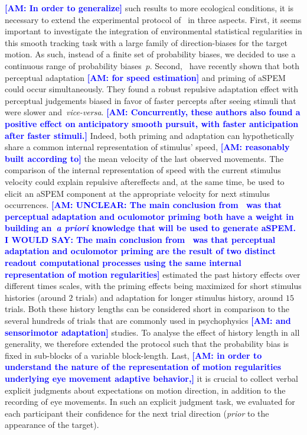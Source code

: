 \documentclass[12pt,english]{article}%
\newcommand{\citet}[1]{\textcite{#1}}
\newcommand{\seeFig}[1]{Figure~\ref{fig:#1}}
\newcommand{\seeSec}[1]{Section~\ref{sec:#1}}
\newcommand{\AM}[1]{\textbf{\textcolor{blue}{[AM: #1]}}}
\begin{document}
\AM{In order to generalize} such results to more ecological conditions,
it is necessary to extend the experimental protocol of~\citet{Montagnini2010} in three aspects.
First, it seems important to investigate the integration of environmental statistical regularities
in this smooth tracking task with
a large family of direction-biases for the target motion.
As such, instead of a finite set of probability biases, %
we decided to use a continuous range of probability biases~$p$. 
Second,~\citet{Maus2015} have recently shown that
both perceptual adaptation \AM{for speed estimation} and priming of aSPEM could occur simultaneously.
They found a robust repulsive adaptation effect
with perceptual judgements biased in favor of faster percepts
after seeing stimuli that were slower and~\textit{vice-versa}. \AM{Concurrently, these authors also found 
a positive effect on anticipatory smooth pursuit, with faster anticipation after faster stimuli.}
Indeed, both priming and adaptation can hypothetically share
a common internal representation of stimulus' speed,
\AM{reasonably built according to} the mean velocity of the last observed movements.
The comparison of the internal representation of speed
with the current stimulus velocity could explain repulsive aftereffects and,
at the same time, be used to elicit 
an aSPEM component at the appropriate velocity
for next stimulus occurrences.
\AM{UNCLEAR: The main conclusion from~\citet{Maus2015} was that
perceptual adaptation and oculomotor priming
both have a weight in building an~\textit{a priori} knowledge
that will be used to generate aSPEM. I WOULD SAY: The main conclusion from~\citet{Maus2015} was that
perceptual adaptation and oculomotor priming
are the result of two distinct readout computational processes using the same internal representation of motion regularities}
\citet{Maus2015} estimated the past history effects over different times scales,
with the priming effects being maximized
for short stimulus histories (around $2$ trials) and
adaptation for longer stimulus history, around $15$ trials.
Both these history lengths can be considered
short in comparison to the several hundreds
of trials that are commonly used in psychophysics \AM{and sensorimotor adaptation} studies.
To analyse the effect of history length in all generality,
we therefore extended the protocol such that the probability bias 
is fixed in sub-blocks of a variable block-length.
Last, \AM{in order to understand the nature of the representation of motion regularities underlying eye movement adaptive behavior,} it is crucial to collect verbal explicit judgments about expectations on motion direction, in addition to the recording of eye movements.
In such an explicit judgment task, we evaluated for each participant their confidence for the next trial direction
(\emph{prior} to the appearance of the target).
\end{document}
